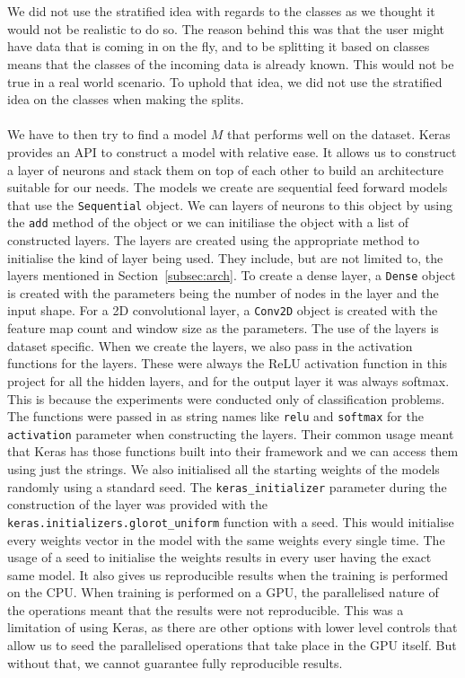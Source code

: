 \documentclass[12pt]{article}
\begin{document}
\\\\
We did not use the stratified idea with regards to the classes as we thought it would not be realistic to do so. The reason behind this was that the user might have data that is coming in on the fly, and to be splitting it based on classes means that the classes of the incoming data is already known. This would not be true in a real world scenario. To uphold that idea, we did not use the stratified idea on the classes when making the splits.
\\\\
We have to then try to find a model $M$ that performs well on the dataset. Keras provides an API to construct a model with relative ease. It allows us to construct a layer of neurons and stack them on top of each other to build an architecture suitable for our needs. The models we create are sequential feed forward models that use the \texttt{Sequential} object. We can layers of neurons to this object by using the \texttt{add} method of the object or we can initiliase the object with a list of constructed layers. The layers are created using the appropriate method to initialise the kind of layer being used. They include, but are not limited to, the layers mentioned in Section~\ref{subsec:arch}. To create a dense layer, a \texttt{Dense} object is created with the parameters being the number of nodes in the layer and the input shape. For a 2D convolutional layer, a \texttt{Conv2D} object is created with the feature map count and window size as the parameters. The use of the layers is dataset specific. When we create the layers, we also pass in the activation functions for the layers. These were always the ReLU activation function in this project for all the hidden layers, and for the output layer it was always softmax. This is because the experiments were conducted only of classification problems. The functions were passed in as string names like \texttt{relu} and \texttt{softmax} for the \texttt{activation} parameter when constructing the layers. Their common usage meant that Keras has those functions built into their framework and we can access them using just the strings. We also initialised all the starting weights of the models randomly using a standard seed. The \texttt{keras\_initializer} parameter during the construction of the layer was provided with the \texttt{keras.initializers.glorot\_uniform} function with a seed. This would initialise every weights vector in the model with the same weights every single time. The usage of a seed to initialise the weights results in every user having the exact same model. It also gives us reproducible results when the training is performed on the CPU. When training is performed on a GPU, the parallelised nature of the operations meant that the results were not reproducible. This was a limitation of using Keras, as there are other options with lower level controls that allow us to seed the parallelised operations that take place in the GPU itself. But without that, we cannot guarantee fully reproducible results.  
\end{document}
